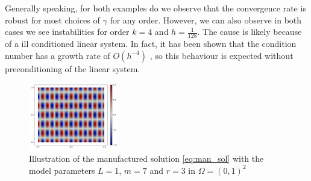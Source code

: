 Generally speaking, for both examples do we observe that the convergence rate is robust for most choices of $\gamma$ for any order. However, we can also observe in both cases we see instabilities for order $k=4$ and $h=\frac{1}{128}$. The cause is
likely because of a ill conditioned linear system. In fact, it has been shown that the condition number has a growth rate of $O\left( h^{-4} \right) $ \cite{li07}, so this behaviour is expected without preconditioning of the linear system.


\begin{figure}[tbh!]
    \centering
    \includegraphics[width=0.35\textwidth]{figures/model/l_1.0_m_7_r_3n_100_sol.png}
    \caption{Illustration of the manufactured solution \eqref{eq:man_sol} with the model parameters $L=1$, $m=7$ and $r=3$ in $\Omega = (0,1)^2$}
    \label{fig:sol_l1_m7_r3}
\end{figure}

